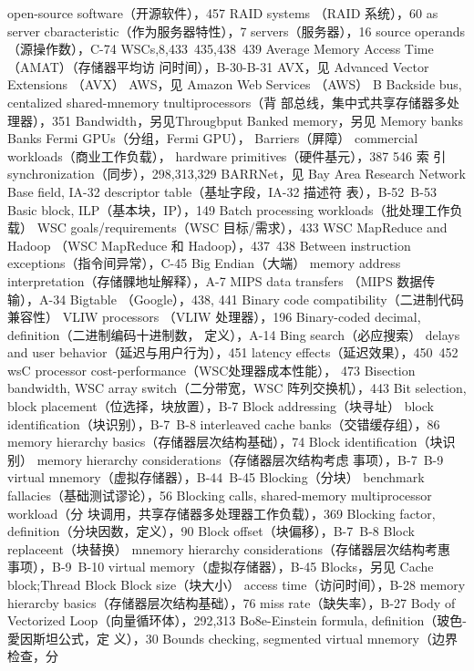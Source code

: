 open-source software（开源软件），457
RAID systems （RAID 系统），60
as server cbaracteristic（作为服务器特性），7
servers（服务器），16
source operands（源操作数），C-74
WSCs,8,433~435,438~439
Average Memory Access Time （AMAT）（存储器平均访
问时间），B-30-B-31
AVX，见 Advanced Vector Extensions （AVX）
AWS，见 Amazon Web Services （AWS）
B
Backside bus, centalized shared-mnemory tnultiprocessors（背
部总线，集中式共享存储器多处理器），351
Bandwidth，另见Througbput
Banked memory，另见 Memory banks
Banks Fermi GPUs（分组，Fermi GPU），
Barriers（屏障）
commercial workloads（商业工作负载），
hardware primitives（硬件基元），387
546
索
引
synchronization（同步），298,313,329
BARRNet，见 Bay Area Research Network
Base field, IA-32 descriptor table（基址字段，IA-32 描述符
表），B-52~B-53
Basic block, ILP（基本块，IP），149
Batch processing workloads（批处理工作负载）
WSC goals/requirements（WSC 目标/需求），433
WSC MapReduce and Hadoop （WSC MapReduce 和
Hadoop），437~438
Between instruction exceptions（指令间异常），C-45
Big Endian（大端）
memory address interpretation（存储髁地址解释），A-7
MIPS data transfers （MIPS 数据传输），A-34
Bigtable （Google），438, 441
Binary code compatibility（二进制代码兼容性）
VLIW processors （VLIW 处理器），196
Binary-coded decimal, definition（二进制编码十进制数，
定义），A-14
Bing search（必应搜索）
delays and user behavior（延迟与用户行为），451
latency effects（延迟效果），450~452
wsC processor cost-performance（WSC处理器成本性能），
473
Bisection bandwidth, WSC array switch（二分带宽，WSC
阵列交换机），443
Bit selection, block placement（位选择，块放置），B-7
Block addressing（块寻址）
block identification（块识别），B-7~B-8
interleaved cache banks（交错缓存组），86
memory hierarchy basics（存储器层次结构基础），74
Block identification（块识别）
memory hierarchy considerations（存储器层次结构考虑
事项），B-7~B-9
virtual mnemory（虚拟存储器），B-44~B-45
Blocking（分块）
benchmark fallacies（基础测试谬论），56
Blocking calls, shared-memory multiprocessor workload（分
块调用，共享存储器多处理器工作负载），369
Blocking factor, definition（分块因数，定义），90
Block offset（块偏移），B-7~B-8
Block replaceent（块替换）
mnemory hierarchy considerations（存储器层次结构考惠
事项），B-9~B-10
virtual memory（虚拟存储器），B-45
Blocks，另见 Cache block;Thread Block
Block size（块大小）
access time（访问时间），B-28
memory hierarcby basics（存储器层次结构基础），76
miss rate（缺失率），B-27
Body of Vectorized Loop（向量循环体），292,313
Bo8e-Einstein formula, definition（玻色-愛因斯坦公式，定
义），30
Bounds checking, segmented virtual mnemory（边界检查，分
